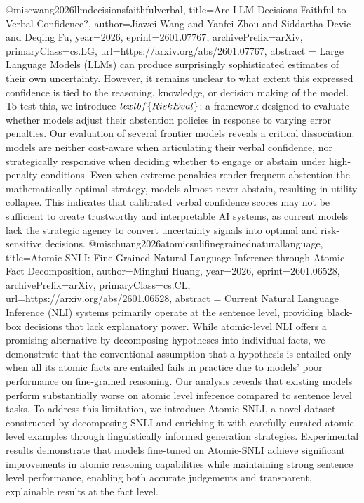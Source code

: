 {}@misc{wang2026llmdecisionsfaithfulverbal,
      title={Are LLM Decisions Faithful to Verbal Confidence?}, 
      author={Jiawei Wang and Yanfei Zhou and Siddartha Devic and Deqing Fu},
      year={2026},
      eprint={2601.07767},
      archivePrefix={arXiv},
      primaryClass={cs.LG},
      url={https://arxiv.org/abs/2601.07767},
      abstract = {Large Language Models (LLMs) can produce surprisingly sophisticated estimates of their own uncertainty. However, it remains unclear to what extent this expressed confidence is tied to the reasoning, knowledge, or decision making of the model. To test this, we introduce $\\textbf\{RiskEval\}$: a framework designed to evaluate whether models adjust their abstention policies in response to varying error penalties. Our evaluation of several frontier models reveals a critical dissociation: models are neither cost-aware when articulating their verbal confidence, nor strategically responsive when deciding whether to engage or abstain under high-penalty conditions. Even when extreme penalties render frequent abstention the mathematically optimal strategy, models almost never abstain, resulting in utility collapse. This indicates that calibrated verbal confidence scores may not be sufficient to create trustworthy and interpretable AI systems, as current models lack the strategic agency to convert uncertainty signals into optimal and risk-sensitive decisions.}
}@misc{huang2026atomicsnlifinegrainednaturallanguage,
      title={Atomic-SNLI: Fine-Grained Natural Language Inference through Atomic Fact Decomposition}, 
      author={Minghui Huang},
      year={2026},
      eprint={2601.06528},
      archivePrefix={arXiv},
      primaryClass={cs.CL},
      url={https://arxiv.org/abs/2601.06528},
      abstract = {Current Natural Language Inference (NLI) systems primarily operate at the sentence level, providing black-box decisions that lack explanatory power. While atomic-level NLI offers a promising alternative by decomposing hypotheses into individual facts, we demonstrate that the conventional assumption that a hypothesis is entailed only when all its atomic facts are entailed fails in practice due to models' poor performance on fine-grained reasoning. Our analysis reveals that existing models perform substantially worse on atomic level inference compared to sentence level tasks. To address this limitation, we introduce Atomic-SNLI, a novel dataset constructed by decomposing SNLI and enriching it with carefully curated atomic level examples through linguistically informed generation strategies. Experimental results demonstrate that models fine-tuned on Atomic-SNLI achieve significant improvements in atomic reasoning capabilities while maintaining strong sentence level performance, enabling both accurate judgements and transparent, explainable results at the fact level.}
}
